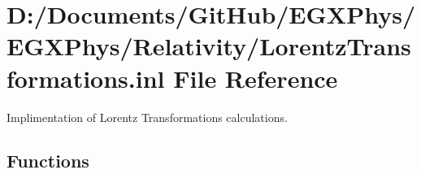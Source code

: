 \hypertarget{_lorentz_transformations_8inl}{}\section{D\+:/\+Documents/\+Git\+Hub/\+E\+G\+X\+Phys/\+E\+G\+X\+Phys/\+Relativity/\+Lorentz\+Transformations.inl File Reference}
\label{_lorentz_transformations_8inl}


Implimentation of Lorentz Transformations calculations.  


\subsection*{Functions}
